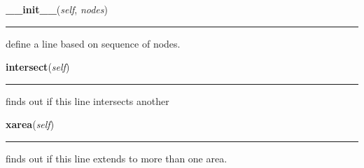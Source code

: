     \vspace{0.5ex}

    \begin{boxedminipage}{\textwidth}

    \raggedright \textbf{\_\_init\_\_}(\textit{self}, \textit{nodes})

    \vspace{-1.5ex}

    \rule{\textwidth}{0.5\fboxrule}
    define a line based on sequence of nodes.

    \vspace{1ex}

    \end{boxedminipage}

    \label{Epigrass:simobj:line:intersect}

    \vspace{0.5ex}

    \begin{boxedminipage}{\textwidth}

    \raggedright \textbf{intersect}(\textit{self})

    \vspace{-1.5ex}

    \rule{\textwidth}{0.5\fboxrule}
    finds out if this line intersects another

    \vspace{1ex}

    \end{boxedminipage}

    \label{Epigrass:simobj:line:xarea}

    \vspace{0.5ex}

    \begin{boxedminipage}{\textwidth}

    \raggedright \textbf{xarea}(\textit{self})

    \vspace{-1.5ex}

    \rule{\textwidth}{0.5\fboxrule}
    finds out if this line extends to more than one area.

    \vspace{1ex}

    \end{boxedminipage}

